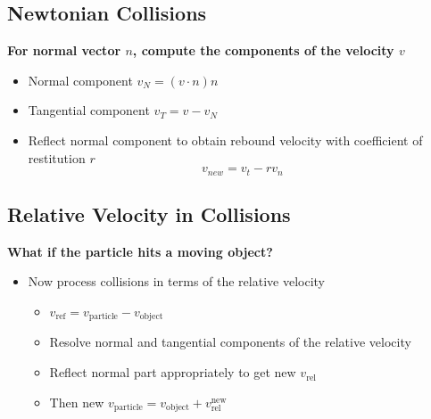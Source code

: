 \documentclass{article}
\begin{document}
\subsection*{Newtonian Collisions}
\textbf{For normal vector $n$, compute the components of the velocity $v$}
\begin{itemize}
    \item Normal component $v_N = (v \cdot n)n$
    \item Tangential component $v_T = v - v_N$
    \item Reflect normal component to obtain rebound velocity with coefficient of restitution $r$
    \[v_{new} = v_t - r v_n\]
\end{itemize}

\subsection*{Relative Velocity in Collisions}
\textbf{What if the particle hits a moving object?}
\begin{itemize}
    \item Now process collisions in terms of the relative velocity
    \begin{itemize}
        \item $v_{\text{ref}} = v_{\text{particle}} - v_{\text{object}}$
        \item Resolve normal and tangential components of the relative velocity
        \item Reflect normal part appropriately to get new $v_{\text{rel}}$
        \item Then new $v_{\text{particle}} = v_{\text{object}} + v_{\text{rel}}^{\text{new}}$
    \end{itemize}
\end{itemize}
\end{document}
